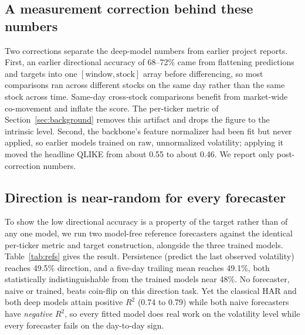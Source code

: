 \documentclass[runningheads]{llncs}
\begin{document}
\subsection{A measurement correction behind these numbers}
Two corrections separate the deep-model numbers from earlier project reports. First, an earlier
directional accuracy of 68--72\% came from flattening predictions and targets into one $[\text{window},
\text{stock}]$ array before differencing, so most comparisons ran across different stocks on the
same day rather than the same stock across time. Same-day cross-stock comparisons benefit from
market-wide co-movement and inflate the score. The per-ticker metric of
Section~\ref{sec:background} removes this artifact and drops the figure to the intrinsic level.
Second, the backbone's feature normalizer had been fit but never applied, so earlier models trained
on raw, unnormalized volatility; applying it moved the headline QLIKE from about 0.55 to about
0.46. We report only post-correction numbers.

\subsection{Direction is near-random for every forecaster}
\label{sec:refbaselines}
To show the low directional accuracy is a property of the target rather than of any one model, we
run two model-free reference forecasters against the identical per-ticker metric and target
construction, alongside the three trained models. Table~\ref{tab:refs} gives the result. Persistence
(predict the last observed volatility) reaches 49.5\% direction, and a five-day trailing mean
reaches 49.1\%, both statistically indistinguishable from the trained models near 48\%. No
forecaster, naive or trained, beats coin-flip on this direction task. Yet the classical HAR and both
deep models attain positive $R^2$ (0.74 to 0.79) while both naive forecasters have \emph{negative}
$R^2$, so every fitted model does real work on the volatility level while every forecaster fails on
the day-to-day sign.
\end{document}
